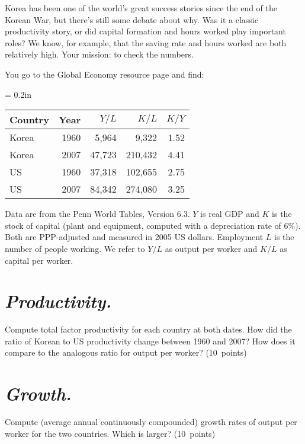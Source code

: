 \documentclass[letterpaper,12pt]{exam}
\begin{document}
\begin{questions}
Korea has been one of the world's great success stories
since the end of the Korean War, 
but there's still some debate about why.  
Was it a classic productivity story, 
or did capital formation and hours worked
play important roles?   
We know, for example, that the saving rate and hours worked 
are both relatively high.    
Your mission:  to check the numbers.  

You go to the Global Economy resource page and find:  
%
\begin{center}
\tabcolsep = 0.2in
\begin{tabular}{lrrrr}
\toprule 
Country   &  Year   &  $Y/L$   &  $K/L$ &  $K/Y$   \\
\midrule 
Korea       & 1960 &  5,964 & 9,322 & 1.52 \\
Korea       & 2007 & 47,723 & 210,432 & 4.41 \\
US          & 1960 & 37,318 & 102,655 & 2.75 \\
US          & 2007 & 84,342 & 274,080 & 3.25 \\
\bottomrule 
\end{tabular}
\end{center}
Data are from the Penn World Tables, Version 6.3.  
$Y$ is real GDP and $K$ is the stock of capital (plant and equipment, 
computed with a depreciation rate of 6\%).  
Both are PPP-adjusted and measured in 2005 US dollars.  
Employment $L$ is the number of people working.  
We refer to $Y/L$ as output per worker and 
$K/L$ as capital per worker.  

%
\begin{parts}

\part {\it Productivity.\/} 
Compute total factor productivity for each country at both dates. 
How did the ratio of Korean to US productivity change between 1960 
and 2007?  
How does it compare to the analogous ratio for output per worker?  
(10~points)

\part {\it Growth.\/}   
Compute (average annual continuously compounded) growth rates 
of output per worker for the two countries. 
Which is larger?  
(10~points)


\end{parts}
\end{questions}
\end{document}
